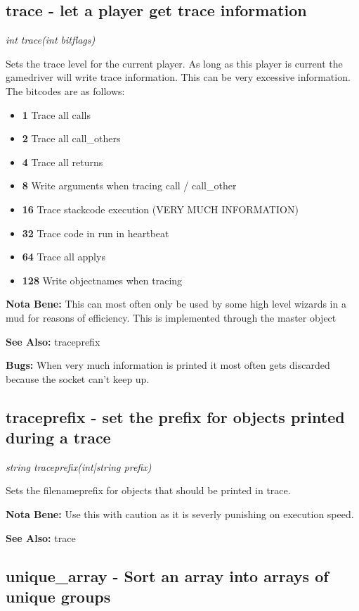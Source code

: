 \subsection{trace - let a player get trace information }

    {\em int trace(int bitflags)}

    Sets the trace level for the current player. As long as this player
    is current the gamedriver will write trace information. This can
    be very excessive information. The bitcodes are as follows:
    \begin{itemize}
    \item{\bf 1} Trace all calls
    \item{\bf 2} Trace all call\_others
    \item{\bf 4} Trace all returns
    \item{\bf 8} Write arguments when tracing call / call\_other
    \item{\bf 16} Trace stackcode execution (VERY MUCH INFORMATION)
    \item{\bf 32} Trace code in run in heartbeat
    \item{\bf 64} Trace all applys
    \item{\bf 128} Write objectnames when tracing
    \end{itemize}

    {\bf Nota Bene: }   This can most often only be used by some high level wizards in a mud
    for reasons of efficiency. This is implemented through the master
    object

    {\bf See Also: }    traceprefix

    {\bf Bugs: }    When very much information is printed it most often gets discarded
    because the socket can't keep up.


\subsection{traceprefix - set the prefix for objects printed during a trace}

    {\em string traceprefix(int|string prefix)}

    Sets the filenameprefix for objects that should be printed in trace.

    {\bf Nota Bene: }   Use this with caution as it is severly punishing on execution speed.

    {\bf See Also: }    trace


\subsection{unique\_array - Sort an array into arrays of unique groups}

